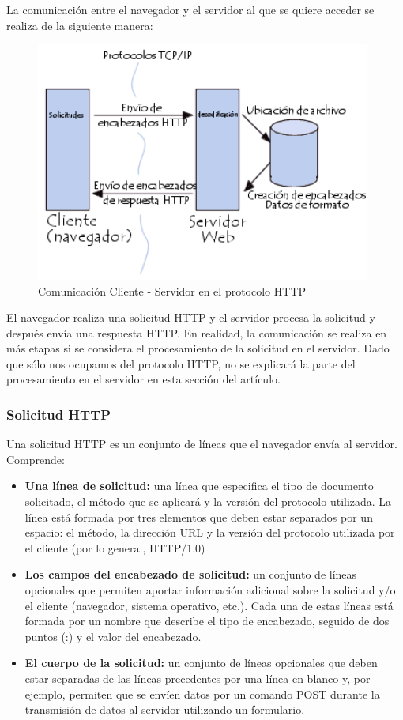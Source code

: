 \documentclass[12pt, a4paper, titlepage]{report}
\begin{document}
            La comunicación entre el navegador y el servidor al que se quiere acceder se realiza de la siguiente manera:
            \begin{figure}[H]
        			\begin{center}	                  \includegraphics[width=11cm]{./imagenes/MarcoTeorico/HTTPcs.png}
        				\caption{Comunicaci\'on Cliente - Servidor en el protocolo HTTP}
        			\end{center}
        	\end{figure}
        	El navegador realiza una solicitud HTTP y el servidor procesa la solicitud y después envía una respuesta HTTP. En realidad, la comunicación se realiza en más etapas si se considera el procesamiento de la solicitud en el servidor. Dado que sólo nos ocupamos del protocolo HTTP, no se explicará la parte del procesamiento en el servidor en esta sección del artículo. 
        	\subsubsection{Solicitud HTTP}
        	    Una solicitud HTTP es un conjunto de líneas que el navegador envía al servidor. Comprende:
        	    \begin{itemize}
        	        \item \textbf{Una línea de solicitud: } una línea que especifica el tipo de documento solicitado, el método que se aplicará y la versión del protocolo utilizada. La línea está formada por tres elementos que deben estar separados por un espacio: el método, la dirección URL y la versión del protocolo utilizada por el cliente (por lo general, HTTP/1.0)
        	        \item \textbf{Los campos del encabezado de solicitud: } un conjunto de líneas opcionales que permiten aportar información adicional sobre la solicitud y/o el cliente (navegador, sistema operativo, etc.). Cada una de estas líneas está formada por un nombre que describe el tipo de encabezado, seguido de dos puntos (:) y el valor del encabezado.
        	        \item \textbf{ El cuerpo de la solicitud: }un conjunto de líneas opcionales que deben estar separadas de las líneas precedentes por una línea en blanco y, por ejemplo, permiten que se envíen datos por un comando POST durante la transmisión de datos al servidor utilizando un formulario. 
        	    \end{itemize}
\end{document}
